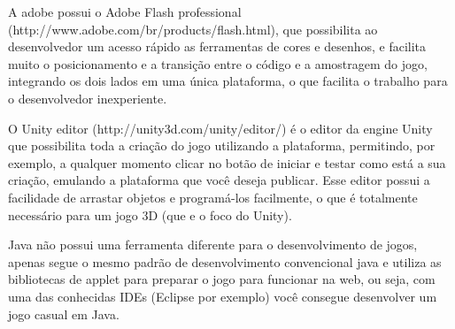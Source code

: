 A adobe possui o Adobe Flash professional (http://www.adobe.com/br/products/flash.html),
que possibilita ao desenvolvedor um acesso rápido as ferramentas de cores
e desenhos, e facilita muito o posicionamento e a transição entre o
código e a amostragem do jogo, integrando os dois lados em uma única
plataforma, o que facilita o trabalho para o desenvolvedor
inexperiente.

O Unity editor (http://unity3d.com/unity/editor/) é o editor da engine Unity que possibilita toda a
criação do jogo utilizando a plataforma, permitindo, por exemplo, a
qualquer momento clicar no botão de iniciar e testar como está a sua
criação, emulando a plataforma que você deseja publicar.
Esse editor possui a facilidade de arrastar objetos e programá-los
facilmente, o que é totalmente necessário para um jogo 3D (que e o
foco do Unity).

Java não possui uma ferramenta diferente para o desenvolvimento de
jogos, apenas segue o mesmo padrão de desenvolvimento convencional
java e utiliza as bibliotecas de applet para preparar o jogo para
funcionar na web, ou seja, com uma das conhecidas IDEs (Eclipse por
exemplo) você consegue desenvolver um jogo casual em Java.
